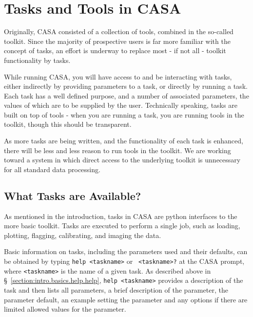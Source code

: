 
\section{Tasks and Tools in CASA}
\label{section:intro.tasks}

Originally, CASA consisted of a collection of tools, combined in the
so-called toolkit.  Since the majority of prospective users is far
more familiar with the concept of tasks, an effort is underway to
replace most - if not all - toolkit functionality by tasks.

While running CASA, you will have access to and be interacting with
tasks, either indirectly by providing parameters to a task, or
directly by running a task.  Each task has a well defined purpose, and
a number of associated parameters, the values of which are to be
supplied by the user.  Technically speaking, tasks are built on top of
tools - when you are running a task, you are running tools in the
toolkit, though this should be transparent.

As more tasks are being written, and the functionality of each task is
enhanced, there will be less and less reason to run tools in the
toolkit.  We are working toward a system in which direct access to the
underlying toolkit is unnecessary for all standard data processing.

\subsection{What Tasks are Available?}
\label{section:intro.tasks.more}

As mentioned in the introduction, tasks in CASA are python interfaces
to the more basic toolkit.  Tasks are executed to perform a single
job, such as loading, plotting, flagging, calibrating, and imaging the
data.

Basic information on tasks, including the parameters used and their
defaults, can be obtained by typing {\tt help <taskname>} or {\tt
<taskname>?} at the CASA prompt, where {\tt <taskname>} is the name of
a given task.  As described above in \S~\ref{section:intro.basics.help.help},
{\tt help <taskname>} provides a description of the task
and then lists all parameters, a brief description of the parameter,
the parameter default, an example setting the parameter and any
options if there are limited allowed values for the parameter.

